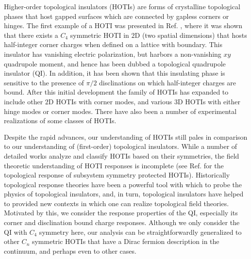 \documentclass[%
 reprint,
 amsmath,amssymb,
 aps,
]{revtex4-1}
\begin{document}
Higher-order topological insulators (HOTIs) are forms of crystalline topological phases that host gapped surfaces which are connected by gapless corners or hinges. The first example of a HOTI was presented in Ref. , where it was shown that there exists a $C_4$ symmetric HOTI in $2$D (two spatial dimensions) that hosts half-integer corner charges when defined on a lattice with boundary. This insulator has vanishing electric polarization, but harbors a non-vanishing $xy$ quadrupole moment, and hence has been dubbed a topological quadrupole insulator (QI). In addition, it has been shown that this insulating phase is sensitive to the presence of $\pi/2$ disclinations on which half-integer charges are bound\cite{li2020fractional}. After this initial development the family of HOTIs has expanded to include other $2$D HOTIs with corner modes, and various $3$D HOTIs with either hinge modes or corner modes\cite{benalcazar2017electric,song2017d,langbehn2017reflection,schindler2018higher,khalaf2018higher,liu2019shift,benalcazar2019quantization,cualuguaru2019higher}. There have also been a number of experimental realizations of some classes of  HOTIs\cite{noh2018topological,serra2018observation,peterson2018quantized,imhof2018topolectrical,xue2019acoustic,zhang2019second,ni2019observation,noguchi2021evidence,schindler2018higherB,aggarwal2021evidence}.

Despite the rapid advances, our understanding of HOTIs still pales in comparison to our understanding of (first-order) topological insulators. While a number of detailed works analyze and classify HOTIs based on their symmetries\cite{song2017topological,song2017interaction,thorngren2018gauging, rasmussen2020classification}, the field theoretic understanding of HOTI responses is incomplete (see Ref.  for the topological response of subsystem symmetry protected HOTIs). Historically topological response theories have been a powerful tool with which to probe the physics of topological insulators, and, in turn, topological insulators have helped to provided new contexts in which one can realize topological field theories\cite{haldane1988,qi2008topological}. 
Motivated by this, we consider the response properties of the QI, especially its corner and disclination bound charge responses. Although we only consider the QI with $C_4$ symmetry here, our analysis can be straightforwardly generalized to other $C_n$ symmetric HOTIs that have a Dirac fermion description in the continuum, and perhaps even to other cases.
\end{document}
